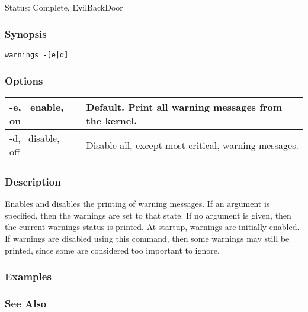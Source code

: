 \subsection{}
\label{warnings}
 Status: Complete, EvilBackDoor
\subsubsection*{Synopsis}
\begin{verbatim}
warnings -[e|d]
\end{verbatim}
\subsubsection*{Options}
\begin{tabular}{|l|l|}
\hline 
 -e, --enable, --on  & Default. Print all warning messages from the kernel.  \\
 \hline 
 -d, --disable, --off  & Disable all, except most critical, warning messages.  \\
 \hline 
\end{tabular}
\subsubsection*{Description}
 Enables and disables the printing of warning messages. If an argument is specified, then the warnings are set to that state. If no argument is given, then the current warnings status is printed. At startup, warnings are initially enabled. If warnings are disabled using this command, then some warnings may still be printed, since some are considered too important to ignore. 
\subsubsection*{Examples}
\subsubsection*{See Also}

